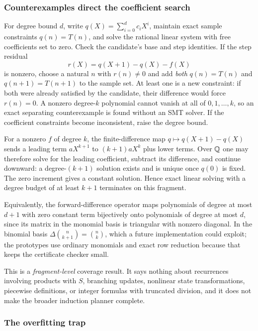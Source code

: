\subsubsection*{Counterexamples direct the coefficient search}

For degree bound $d$, write $q(X)=\sum_{i=0}^d c_iX^i$, maintain exact sample
constraints $q(n)=T(n)$, and solve the rational linear system with free
coefficients set to zero. Check the candidate's base and step identities. If the
step residual
\[
r(X)=q(X+1)-q(X)-f(X)
\]
is nonzero, choose a natural $n$ with $r(n)\ne0$ and add \emph{both} $q(n)=T(n)$
and $q(n+1)=T(n+1)$ to the sample set. At least one is a new constraint: if both
were already satisfied by the candidate, their difference would force $r(n)=0$.
A nonzero degree-$k$ polynomial cannot vanish at all of $0,1,\ldots,k$, so an
exact separating counterexample is found without an SMT solver. If the
coefficient constraints become inconsistent, raise the degree bound.

\begin{proposition}
\label{prop:rec-complete}
For a nonzero $f$ of degree $k$, the finite-difference map
$q\mapsto q(X+1)-q(X)$ sends a leading term $aX^{k+1}$ to $(k+1)aX^k$ plus lower
terms. Over $\mathbb{Q}$ one may therefore solve for the leading coefficient, subtract
its difference, and continue downward: a degree-$(k+1)$ solution exists and is
unique once $q(0)$ is fixed. The zero increment gives a constant solution.
Hence exact linear solving with a degree budget of at least $k+1$ terminates on
this fragment.
\end{proposition}

Equivalently, the forward-difference operator maps polynomials of degree at most
$d+1$ with zero constant term bijectively onto polynomials of degree at most
$d$, since its matrix in the monomial basis is triangular with nonzero diagonal.
In the binomial basis $\Delta\binom{n}{k+1}=\binom{n}{k}$, which a future
implementation could exploit; the prototypes use ordinary monomials and exact
row reduction because that keeps the certificate checker small.

This is a \emph{fragment-level} coverage result. It says nothing about
recurrences involving products with $S$, branching updates, nonlinear state
transformations, piecewise definitions, or integer formulas with truncated
division, and it does not make the broader induction planner complete.

\subsubsection*{The overfitting trap}

